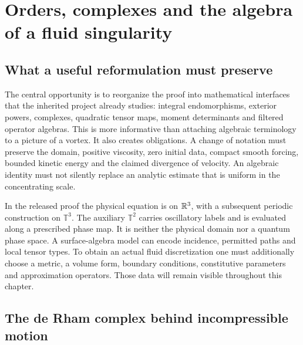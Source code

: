 \chapter{Orders, complexes and the algebra of a fluid singularity}
\label{ch:fluid-structures}

\section{What a useful reformulation must preserve}

The central opportunity is to reorganize the proof into mathematical interfaces that the inherited project already studies: integral endomorphisms, exterior powers, complexes, quadratic tensor maps, moment determinants and filtered operator algebras. This is more informative than attaching algebraic terminology to a picture of a vortex. It also creates obligations. A change of notation must preserve the domain, positive viscosity, zero initial data, compact smooth forcing, bounded kinetic energy and the claimed divergence of velocity. An algebraic identity must not silently replace an analytic estimate that is uniform in the concentrating scale.

In the released proof the physical equation is on $\mathbb{R}^3$, with a subsequent periodic construction on $\mathbb T^3$. The auxiliary $\mathbb T^2$ carries oscillatory labels and is evaluated along a prescribed phase map. It is neither the physical domain nor a quantum phase space. A surface-algebra model can encode incidence, permitted paths and local tensor types. To obtain an actual fluid discretization one must additionally choose a metric, a volume form, boundary conditions, constitutive parameters and approximation operators. Those data will remain visible throughout this chapter.

\section{The de Rham complex behind incompressible motion}

